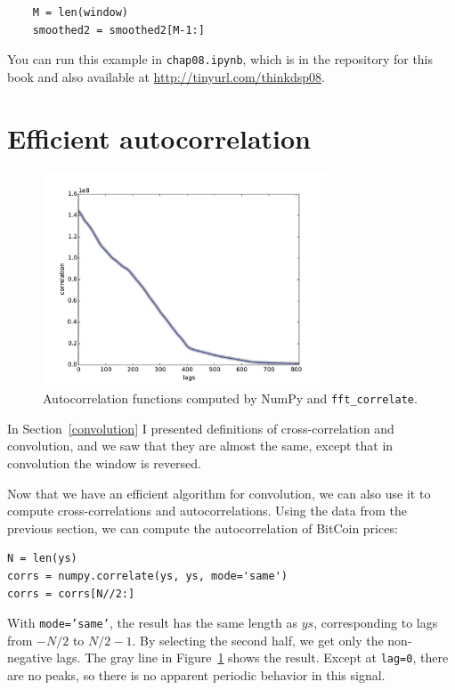 \documentclass[12pt]{book}
\begin{document}
\begin{verbatim}
    M = len(window)
    smoothed2 = smoothed2[M-1:]
\end{verbatim}

You can run this example in
{\tt chap08.ipynb}, which is in the repository for this
book and also available at \url{http://tinyurl.com/thinkdsp08}.


\section{Efficient autocorrelation}

\begin{figure}
\centerline{\includegraphics[height=2.5in]{figs/convolution9.pdf}}
\caption{Autocorrelation functions computed by NumPy and
  {\tt fft\_correlate}.}
\label{fig.convolution9}
\end{figure}

In Section~\ref{convolution} I presented definitions of
cross-correlation and convolution, and we saw that they are
almost the same, except that in convolution the window is
reversed.

Now that we have an efficient algorithm for convolution, we
can also use it to compute cross-correlations and autocorrelations.
Using the data from the previous section, we can compute the
autocorrelation of BitCoin prices:

\begin{verbatim}
N = len(ys)
corrs = numpy.correlate(ys, ys, mode='same')
corrs = corrs[N//2:]
\end{verbatim}

With {\tt mode='same'}, the result has the same length as $ys$,
corresponding to lags from $-N/2$ to $N/2-1$.  By selecting the
second half, we get only the non-negative lags.
The gray line in Figure~\ref{fig.convolution9} shows the result.
Except at {\tt lag=0}, there are no peaks, so there is no apparent
periodic behavior in this signal.
\end{document}
